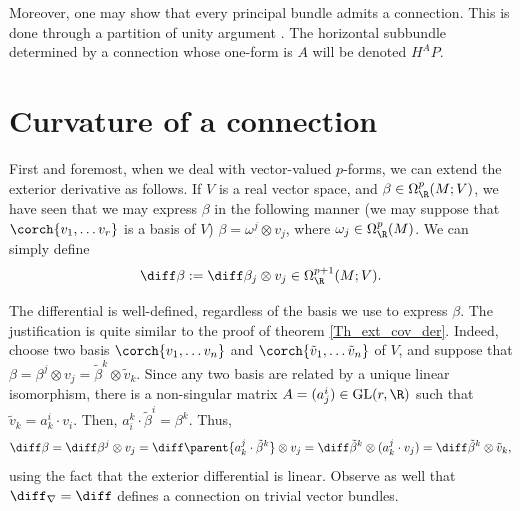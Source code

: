 Moreover, one may show that every principal bundle admits a connection. This is done through a partition of unity argument \parencite[Prop. 1.3.7]{Rudolph_2017pug}. The horizontal subbundle determined by a connection whose one-form is \(A\) will be denoted \(H^AP\).\\


\section{Curvature of a connection}
First and foremost, when we deal with vector-valued \(p\)-forms, we can extend the exterior derivative as follows. If \(V\) is a real vector space, and \(\beta\in \Omega^p_\R(M;V)\), we have seen that we may express \(\beta\) in the following manner (we may suppose that \(\corch{v_1, \ldots v_r}\) is a basis of \(V\)) \(\beta=\omega^j\otimes v_j\), where \(\omega_j \in \Omega^p_\R(M)\). We can simply define
\[
\diff \beta:= \diff \beta_j \otimes v_j\in \Omega_\R^{p+1}(M;V).
\]
\begin{obs}
    The differential is well-defined, regardless of the basis we use to express \(\beta\). The justification is quite similar to the proof of theorem \ref{Th_ext_cov_der}. Indeed, choose two basis \(\corch{v_1, \ldots v_n}\) and \(\corch{\tilde{v}_1, \ldots \tilde{v}_n}\) of  \(V\), and suppose that \(\beta=\beta^j \otimes v_j=\tilde{\beta}^k \otimes \tilde{v}_k\). Since any two basis are related by a unique linear isomorphism, there is a non-singular matrix \(A=(a^i_j)\in \mathrm{GL}(r, \R)\) such that \(\tilde{v}_k=a^i_k \cdot v_i\). Then, \(a^k_i \cdot \tilde{\beta}^i=\beta^k\). Thus,
    \[
    \diff \beta=\diff \beta^j\otimes v_j = \diff \parent{a^j_k \cdot \tilde{\beta}^k}\otimes v_j = \diff \tilde{\beta}^k \otimes (a^j_k \cdot v_j)=\diff \tilde{\beta}^k \otimes \tilde{v}_k,
    \]
    using the fact that the exterior differential is linear. Observe as well that \(\diff_\nabla=\diff\) defines a connection on trivial vector bundles.
\end{obs}

